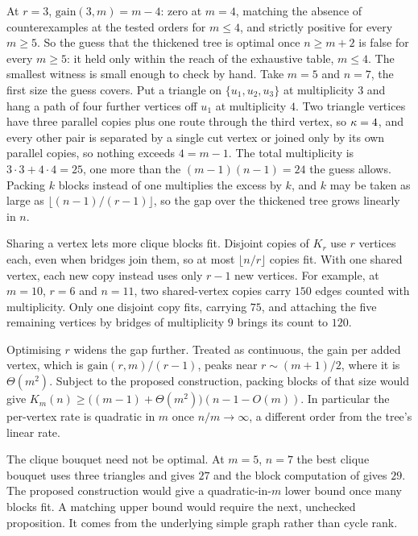 At $r = 3$, $\mathrm{gain}(3,m) = m-4$: zero at $m = 4$, matching the absence of counterexamples at the tested orders for $m \le 4$, and strictly positive for every $m \ge 5$. So the guess that the thickened tree is optimal once $n \ge m+2$ is false for every $m \ge 5$: it held only within the reach of the exhaustive table, $m \le 4$. The smallest witness is small enough to check by hand. Take $m = 5$ and $n = 7$, the first size the guess covers. Put a triangle on $\{u_1, u_2, u_3\}$ at multiplicity $3$ and hang a path of four further vertices off $u_1$ at multiplicity $4$. Two triangle vertices have three parallel copies plus one route through the third vertex, so $\kappa = 4$, and every other pair is separated by a single cut vertex or joined only by its own parallel copies, so nothing exceeds $4 = m-1$. The total multiplicity is $3 \cdot 3 + 4 \cdot 4 = 25$, one more than the $(m-1)(n-1) = 24$ the guess allows. Packing $k$ blocks instead of one multiplies the excess by $k$, and $k$ may be taken as large as $\lfloor (n-1)/(r-1) \rfloor$, so the gap over the thickened tree grows linearly in $n$.

Sharing a vertex lets more clique blocks fit. Disjoint copies of $K_r$ use $r$ vertices each, even when bridges join them, so at most $\lfloor n/r \rfloor$ copies fit. With one shared vertex, each new copy instead uses only $r-1$ new vertices. For example, at $m = 10$, $r = 6$ and $n = 11$, two shared-vertex copies carry $150$ edges counted with multiplicity. Only one disjoint copy fits, carrying $75$, and attaching the five remaining vertices by bridges of multiplicity $9$ brings its count to $120$.

Optimising $r$ widens the gap further. Treated as continuous, the gain per added vertex, which is $\mathrm{gain}(r,m)/(r-1)$, peaks near $r \sim (m+1)/2$, where it is $\Theta(m^2)$. Subject to the proposed construction, packing blocks of that size would give $K_m(n) \ge \bigl((m-1) + \Theta(m^2)\bigr)(n-1-O(m))$. In particular the per-vertex rate is quadratic in $m$ once $n/m\to\infty$, a different order from the tree's linear rate.

The clique bouquet need not be optimal. At $m = 5$, $n = 7$ the best clique bouquet uses three triangles and gives
$27$ and the block computation of  gives $29$.
The proposed construction would give a quadratic-in-$m$ lower bound once many
blocks fit. A matching upper bound would require the next, unchecked
proposition. It comes from the underlying simple graph rather than cycle rank.

